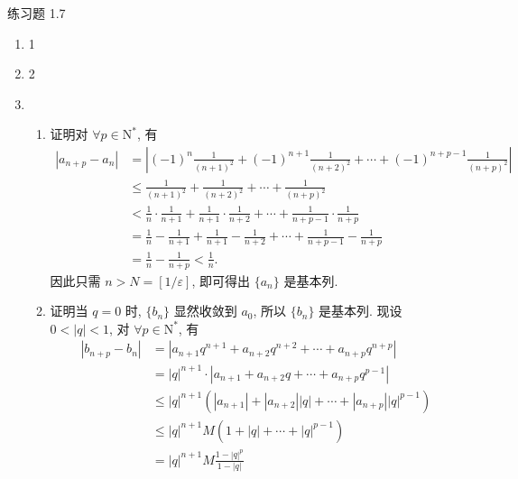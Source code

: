 \documentclass[12pt, a4paper]{article}
\begin{document}
\pagestyle{empty}

\begin{center}
    {\heiti 练习题 1.7}
\end{center}

\begin{enumerate}
    \item 1
    \item 2
    \item 
        \begin{enumerate}[(1)]
            \item {\heiti 证明}\quad 对 $\forall p \in \mathrm{N}^*$, 有
                \begin{align*}
                    |a_{n+p} - a_n| &= \left|(-1)^n\frac{1}{(n+1)^2} + (-1)^{n+1}\frac{1}{(n+2)^2} + \cdots + (-1)^{n+p-1}\frac{1}{(n+p)^2}\right| \\
                                    &\leqslant \frac{1}{(n+1)^2} + \frac{1}{(n+2)^2} + \cdots + \frac{1}{(n+p)^2} \\
                                    &< \frac1n \cdot \frac{1}{n+1} + \frac{1}{n+1} \cdot \frac{1}{n+2} + \cdots + \frac{1}{n+p-1} \cdot \frac{1}{n+p} \\
                                    &= \frac1n - \frac{1}{n+1} + \frac{1}{n+1} - \frac{1}{n+2} + \cdots + \frac{1}{n+p-1} - \frac{1}{n+p} \\
                                    &= \frac1n - \frac{1}{n+p} < \frac1n.
                \end{align*}
                因此只需 $n > N = [1/\varepsilon]$, 即可得出 $\{a_n\}$ 是基本列.
            \item {\heiti 证明}\quad 当 $q = 0$ 时, $\{b_n\}$ 显然收敛到 $a_0$, 所以 $\{b_n\}$ 是基本列. 现设 $0 < |q| < 1$, 对 $\forall p \in \mathrm{N}^*$, 有
                \begin{align*}
                    |b_{n+p} - b_n| &= |a_{n+1}q^{n+1} + a_{n+2}q^{n+2} + \cdots + a_{n+p}q^{n+p}| \\
                                    &= |q|^{n+1} \cdot |a_{n+1} + a_{n+2}q + \cdots + a_{n+p}q^{p-1}| \\
                                    &\leqslant |q|^{n+1}(|a_{n+1}| + |a_{n+2}||q| + \cdots + |a_{n+p}||q|^{p-1}) \\
                                    &\leqslant |q|^{n+1}M (1 + |q| + \cdots + |q|^{p-1}) \\
                                    &=|q|^{n+1}M\frac{1-|q|^p}{1-|q|} \\

\end{align*}
\end{enumerate}
\end{enumerate}
\end{document}
